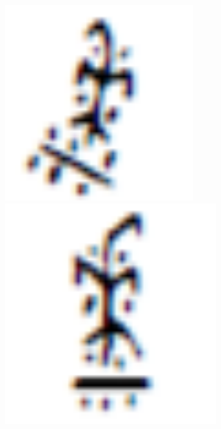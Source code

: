 \documentclass[journal]{IEEEtran}
\begin{document}
\begin{figure}[h]
\begin{minipage}{0.2\linewidth}
	\end{minipage}
	\begin{minipage}{0.2\linewidth}
		\includegraphics[width=0.8\linewidth]{fig/observation-1-3.png}
		\includegraphics[width=0.8\linewidth]{fig/observation-1-4.png}
	\end{minipage}
	\begin{minipage}{0.2\linewidth}

\end{minipage}
\end{figure}
\end{document}
